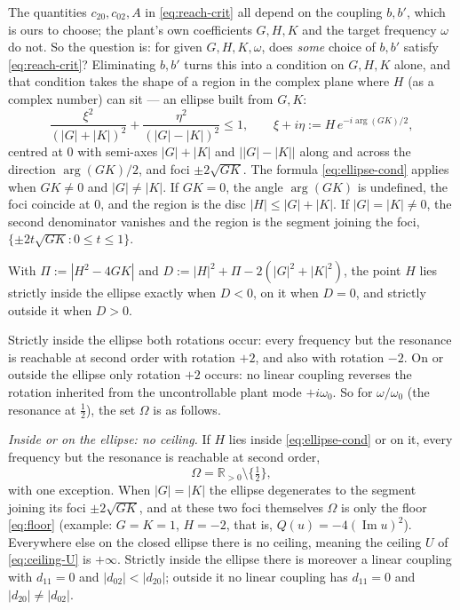 \documentclass[11pt,reqno]{amsart}
\theoremstyle{plain}
\theoremstyle{definition}
\theoremstyle{remark}
\newcommand{\R}{\mathbb{R}}
\begin{document}
The quantities $c_{20},c_{02},A$ in \eqref{eq:reach-crit} all depend on the coupling $b,b'$, which
is ours to choose; the plant's own coefficients $G,H,K$ and the target frequency $\omega$ do not.
So the question is: for given $G,H,K,\omega$, does \emph{some} choice of $b,b'$
satisfy \eqref{eq:reach-crit}? Eliminating $b,b'$ turns this into a condition on $G,H,K$ alone,
and that condition takes the
shape of a region in the complex plane where $H$ (as a complex number) can sit --- an ellipse
built from $G,K$:
\begin{equation}\label{eq:ellipse-cond}
  \frac{\xi^{2}}{(|G|+|K|)^{2}}+\frac{\eta^{2}}{(|G|-|K|)^{2}}\le1,
  \qquad \xi+i\eta:=H\,e^{-i\arg(GK)/2},
\end{equation}
centred at $0$ with semi-axes $|G|+|K|$ and $\bigl||G|-|K|\bigr|$ along and across the direction
$\arg(GK)/2$, and foci $\pm2\sqrt{GK}$. The formula \eqref{eq:ellipse-cond} applies when $GK\neq0$ and
$|G|\neq|K|$. If $GK=0$, the angle $\arg(GK)$ is undefined, the foci coincide at $0$, and the region is the
disc $|H|\le|G|+|K|$. If $|G|=|K|\neq0$, the second denominator vanishes and the region is the segment
joining the foci, $\{\pm2t\sqrt{GK}:0\le t\le1\}$.

With $\Pi:=|H^{2}-4GK|$ and $D:=|H|^{2}+\Pi-2(|G|^{2}+|K|^{2})$, the point $H$ lies strictly inside the
ellipse exactly when $D<0$, on it when $D=0$, and strictly outside it when $D>0$.

Strictly inside the ellipse both rotations occur: every frequency but the resonance is
reachable at second order with rotation $+2$, and also with rotation $-2$. On or outside the
ellipse only rotation $+2$ occurs: no linear coupling reverses the rotation inherited from the
uncontrollable plant mode $+i\omega_0$. So for $\omega/\omega_0$ (the resonance at $\tfrac12$), the
set $\Omega$ is as follows.

\emph{Inside or on the ellipse: no ceiling.} If $H$ lies inside \eqref{eq:ellipse-cond} or on it,
every frequency but the resonance is reachable at second order,
\begin{equation}\label{eq:inside}
  \Omega=\R_{>0}\setminus\{\tfrac12\},
\end{equation}
with one exception. When $|G|=|K|$ the ellipse degenerates to the segment joining its foci
$\pm2\sqrt{GK}$, and at these two foci themselves $\Omega$ is only the floor \eqref{eq:floor}
(example: $G=K=1$, $H=-2$, that is, $Q(u)=-4(\operatorname{Im}u)^{2}$). Everywhere else on the closed
ellipse there is no ceiling, meaning the ceiling $U$ of \eqref{eq:ceiling-U} is $+\infty$.
Strictly inside the ellipse there is moreover a linear coupling with $d_{11}=0$ and
$|d_{02}|<|d_{20}|$; outside it no linear coupling has $d_{11}=0$ and $|d_{20}|\neq|d_{02}|$.
\end{document}
